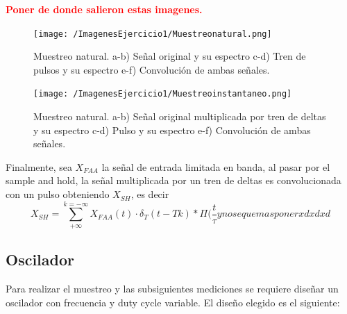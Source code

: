 \begin{center}
	\textcolor{red}{\textbf{\textbf{Poner de donde salieron estas imagenes.}}}
\end{center}

\begin{figure}[H]
\centering
\texttt{[image: /ImagenesEjercicio1/Muestreonatural.png]}
\caption{Muestreo natural. a-b) Señal original y su espectro c-d) Tren de pulsos y su espectro e-f) Convolución de ambas señales.}
\label{fig:muestreonatural}
\end{figure}
\begin{figure}[H]
\centering
\texttt{[image: /ImagenesEjercicio1/Muestreoinstantaneo.png]}
\caption{Muestreo natural. a-b) Señal original multiplicada por tren de deltas y su espectro c-d) Pulso y su espectro e-f) Convolución de ambas señales.}
\label{fig:muestreoinstantaneo}
\end{figure}

Finalmente, sea $X_{FAA}$ la señal de entrada limitada en banda, al pasar por el sample and hold, la señal multiplicada por un tren de deltas es convolucionada con un pulso obteniendo $X_{SH}$, es decir
\begin{equation}
X_{SH} = \sum_{+\infty}^{k = -\infty}X_{FAA}(t)\cdot \delta_T(t-Tk) * \Pi(\frac{t}{\tau} y no se que mas poner xdxdxd
\end{equation}

\subsection{Oscilador}
Para realizar el muestreo y las subsiguientes mediciones se requiere diseñar un oscilador con frecuencia y duty cycle variable. El diseño elegido es el siguiente:

